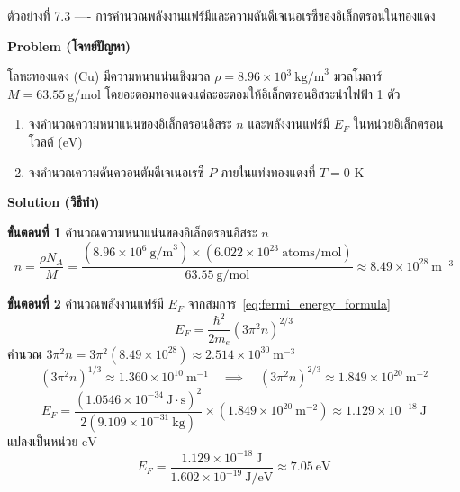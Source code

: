 \begin{psctbox}{ตัวอย่างที่ 7.3 ---- การคำนวณพลังงานแฟร์มีและความดันดีเจเนอเรซีของอิเล็กตรอนในทองแดง}

\textbf{Problem (โจทย์ปัญหา)}

โลหะทองแดง ($\text{Cu}$) มีความหนาแน่นเชิงมวล $\rho = 8.96 \times 10^3~\text{kg/m}^3$ มวลโมลาร์ $M = 63.55~\text{g/mol}$ โดยอะตอมทองแดงแต่ละอะตอมให้อิเล็กตรอนอิสระนำไฟฟ้า 1 ตัว
\begin{enumerate}
    \item จงคำนวณความหนาแน่นของอิเล็กตรอนอิสระ $n$ และพลังงานแฟร์มี $E_F$ ในหน่วยอิเล็กตรอนโวลต์ ($\text{eV}$)
    \item จงคำนวณความดันควอนตัมดีเจเนอเรซี $P$ ภายในแท่งทองแดงที่ $T = 0\text{ K}$
\end{enumerate}

\textbf{Solution (วิธีทำ)}

\textbf{ขั้นตอนที่ 1} คำนวณความหนาแน่นของอิเล็กตรอนอิสระ $n$
\begin{equation*}
n = \frac{\rho N_A}{M} = \frac{(8.96 \times 10^6~\text{g/m}^3) \times (6.022 \times 10^{23}~\text{atoms/mol})}{63.55~\text{g/mol}} \approx 8.49 \times 10^{28}~\text{m}^{-3}
\end{equation*}

\textbf{ขั้นตอนที่ 2} คำนวณพลังงานแฟร์มี $E_F$
จากสมการ~\eqref{eq:fermi_energy_formula}
\begin{equation*}
E_F = \frac{\hbar^2}{2m_e} (3\pi^2 n)^{2/3}
\end{equation*}
คำนวณ $3\pi^2 n = 3 \pi^2 (8.49 \times 10^{28}) \approx 2.514 \times 10^{30}~\text{m}^{-3}$
\begin{equation*}
(3\pi^2 n)^{1/3} \approx 1.360 \times 10^{10}~\text{m}^{-1} \quad \implies \quad (3\pi^2 n)^{2/3} \approx 1.849 \times 10^{20}~\text{m}^{-2}
\end{equation*}
\begin{equation*}
E_F = \frac{(1.0546 \times 10^{-34}~\text{J}\cdot\text{s})^2}{2(9.109 \times 10^{-31}~\text{kg})} \times (1.849 \times 10^{20}~\text{m}^{-2}) \approx 1.129 \times 10^{-18}~\text{J}
\end{equation*}
แปลงเป็นหน่วย $\text{eV}$
\begin{equation*}
E_F = \frac{1.129 \times 10^{-18}~\text{J}}{1.602 \times 10^{-19}~\text{J/eV}} \approx 7.05~\text{eV}
\end{equation*}


\end{psctbox}
